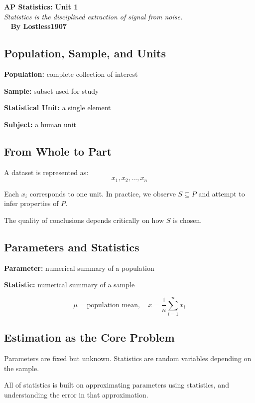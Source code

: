 \documentclass[11pt]{article}
\begin{document}
\begin{center}
{\LARGE \textbf{AP Statistics: Unit 1}} \\[4pt]
{\small \textit{Statistics is the disciplined extraction of signal from noise.}} \\
{\small \textbf{~ By Lostless1907}}
\end{center}

\vspace{10pt}


\begin{tcolorbox}[mybox]
\section*{Population, Sample, and Units}

\textbf{Population:} complete collection of interest  

\textbf{Sample:} subset used for study  

\textbf{Statistical Unit:} a single element  

\textbf{Subject:} a human unit  

\subsection*{From Whole to Part}

A dataset is represented as:
\[
x_1, x_2, \dots, x_n
\]

Each $x_i$ corresponds to one unit.  
In practice, we observe $S \subseteq P$ and attempt to infer properties of $P$.

The quality of conclusions depends critically on how $S$ is chosen.
\end{tcolorbox}


\begin{tcolorbox}[mybox]
\section*{Parameters and Statistics}

\textbf{Parameter:} numerical summary of a population  

\textbf{Statistic:} numerical summary of a sample  

\[
\mu = \text{population mean}, \quad 
\bar{x} = \frac{1}{n}\sum_{i=1}^{n} x_i
\]

\subsection*{Estimation as the Core Problem}

Parameters are fixed but unknown.  
Statistics are random variables depending on the sample.

All of statistics is built on approximating parameters using statistics, and understanding the error in that approximation.
\end{tcolorbox}
\end{document}
